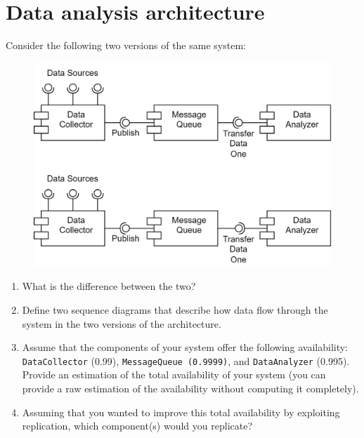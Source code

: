 \section{Data analysis architecture}

Consider the following two versions of the same system: 
\begin{figure}[H]
    \centering
    \includegraphics[width=0.75\linewidth]{images/da.png}
\end{figure}
\begin{enumerate}
    \item What is the difference between the two?
    \item Define two sequence diagrams that describe how data flow through the system in the two versions of the architecture. 
    \item Assume that the components of your system offer the following availability: \texttt{DataCollector} (0.99), \texttt{MessageQueue (0.9999)}, and \texttt{DataAnalyzer} (0.995). 
        Provide an estimation of the total availability of your system (you can provide a raw estimation of the availability without computing it completely).
    \item Assuming that you wanted to improve this total availability by exploiting replication, which component(s) would you replicate?
\end{enumerate}

